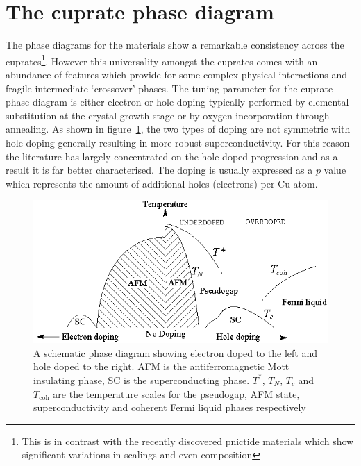\section{The cuprate phase diagram}

The phase diagrams for the \highTc materials show a remarkable consistency across the cuprates\footnote{This is in contrast with the recently discovered pnictide materials which show significant variations in scalings and even composition}. However this universality amongst the cuprates comes with an abundance of features which provide for some complex physical interactions and fragile intermediate `crossover' phases. The tuning parameter for the cuprate phase diagram is either electron or hole doping typically performed by elemental substitution at the crystal growth stage or by oxygen incorporation through annealing. As shown in figure~\ref{Fig:Intro:ElecHolePhaseDiagram}, the two types of doping are not symmetric with hole doping generally resulting in more robust superconductivity. For this reason the literature has largely concentrated on the hole doped progression and as a result it is far better characterised. The doping is usually expressed as a $p$ value which represents the amount of additional holes (electrons) per Cu atom.
\begin{figure}[htbp]
    \begin{center}
        \includegraphics[scale=1.0]{Chapter-Introduction/Figures/ElecHolePhaseDiagram/ElecHolePhaseDiagram}
        \caption{A schematic phase diagram showing electron doped to the left and hole doped to the right. \ac{AFM} is the antiferromagnetic Mott insulating phase, SC is the superconducting phase. $T^*$, $T_N$, $T_c$ and $T_{\textrm{coh}}$ are the temperature scales for the pseudogap, \ac{AFM} state, superconductivity and coherent Fermi liquid phases respectively}
        \label{Fig:Intro:ElecHolePhaseDiagram}
    \end{center}
\end{figure}

